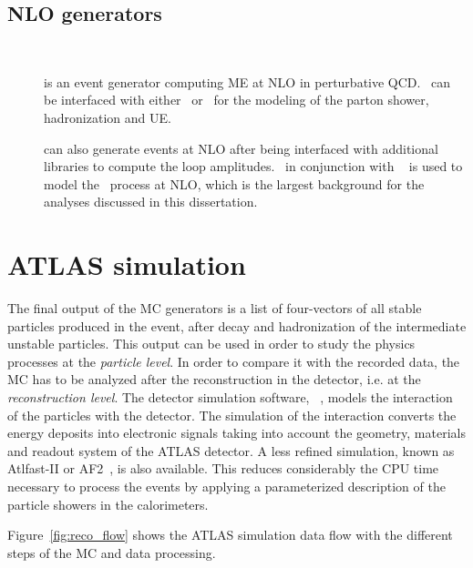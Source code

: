 \subsection{NLO generators}
\begin{description}
  \item[\powheg~\cite{Frixione:2007vw}] is an event generator computing ME at NLO in perturbative QCD. \powheg\ can be interfaced with either \pythia\ or \herwig\ for the modeling of the parton shower, hadronization and UE. 
  \item[\sherpa] can also generate events at NLO after being interfaced with additional libraries to compute the loop amplitudes. \sherpa\ in conjunction with \OpenLoops~\cite{Cascioli:2011va} is used to model the \ttbb\ process at NLO, which is the largest background for the analyses discussed in this dissertation.
\end{description}

\section{ATLAS simulation}
\label{sec:ATLASsim}
The final output of the MC generators is a list of four-vectors of all stable particles produced in the event, after decay and hadronization of the intermediate unstable particles. This output can be used in order to study the physics processes at the \textit{particle level}. In order to compare it with the recorded data, the MC has to be analyzed after the reconstruction in the detector, i.e. at the \textit{reconstruction level}. The detector simulation software, \Geant~\cite{G4}, models the interaction of the particles with the detector. The simulation of the interaction converts the energy deposits into electronic signals taking into account the geometry, materials and readout system of the ATLAS detector.
A less refined simulation, known as Atlfast-II or AF2~\cite{AF2}, is also available. This reduces considerably the CPU time necessary to process the events by applying a parameterized description of the particle showers in the calorimeters.

Figure~\ref{fig:reco_flow} shows the ATLAS simulation data flow with the different steps of the MC and data processing.

